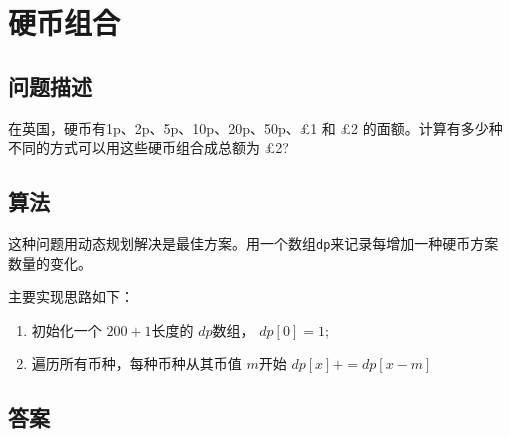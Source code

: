 \section{硬币组合}
\subsection{问题描述}
\begin{tcolorbox}

	在英国，硬币有1p、2p、5p、10p、20p、50p、£1 和 £2 的面额。计算有多少种不同的方式可以用这些硬币组合成总额为 £2?
\end{tcolorbox}

\subsection{算法}
这种问题用动态规划解决是最佳方案。用一个数组\texttt{dp}来记录每增加一种硬币方案数量的变化。

主要实现思路如下：
\begin{enumerate}
	\item 初始化一个 \( 200 + 1 \)长度的 \( dp \)数组， \( dp[0] = 1 \);
	\item 遍历所有币种，每种币种从其币值 \( m \)开始 \( dp[x] += dp[x - m] \)
\end{enumerate}

\subsection{答案}
